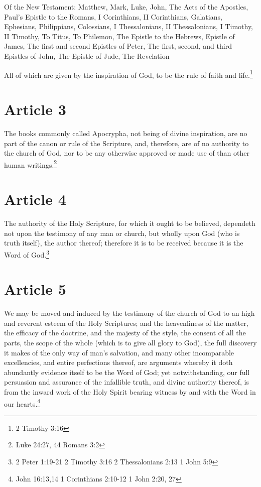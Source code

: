\documentclass[12pt,letterpaper]{book}
\begin{document}
Of the New Testament: Matthew, Mark, Luke, John, The Acts of the Apostles, Paul's Epistle to the Romans, I Corinthians, II Corinthians, Galatians, Ephesians, Philippians, Colossians, I Thessalonians, II Thessalonians, I Timothy, II Timothy, To Titus, To Philemon, The Epistle to the Hebrews, Epistle of James, The first and second Epistles of Peter, The first, second, and third Epistles of John, The Epistle of Jude, The Revelation

All of which are given by the inspiration of God, to be the rule of faith and life.\footnote{2 Timothy 3:16}

\section{Article 3}

The books commonly called Apocrypha, not being of divine inspiration, are no part of the canon or rule of the Scripture, and, therefore, are of no authority to the church of God, nor to be any otherwise approved or made use of than other human writings.\footnote{Luke 24:27, 44 Romans 3:2}

\section{Article 4}

The authority of the Holy Scripture, for which it ought to be believed, dependeth not upon the testimony of any man or church, but wholly upon God (who is truth itself), the author thereof; therefore it is to be received because it is the Word of God.\footnote{2 Peter 1:19-21 2 Timothy 3:16 2 Thessalonians 2:13 1 John 5:9}

\section{Article 5}

We may be moved and induced by the testimony of the church of God to an high and reverent esteem of the Holy Scriptures; and the heavenliness of the matter, the efficacy of the doctrine, and the majesty of the style, the consent of all the parts, the scope of the whole (which is to give all glory to God), the full discovery it makes of the only way of man's salvation, and many other incomparable excellencies, and entire perfections thereof, are arguments whereby it doth abundantly evidence itself to be the Word of God; yet notwithstanding, our full persuasion and assurance of the infallible truth, and divine authority thereof, is from the inward work of the Holy Spirit bearing witness by and with the Word in our hearts.\footnote{John 16:13,14 1 Corinthians 2:10-12 1 John 2:20, 27}
\end{document}
